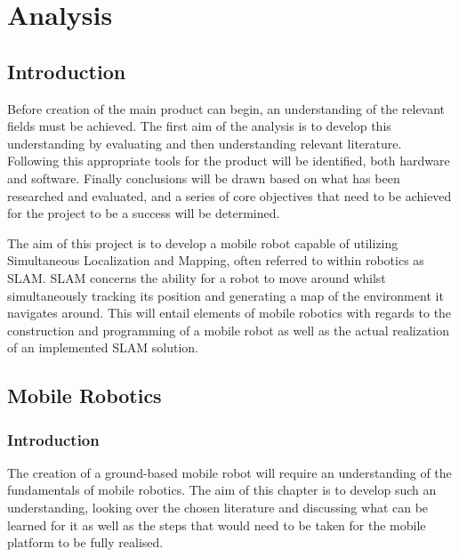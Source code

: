 \part{Analysis}
		\chapter{Introduction}
		Before creation of the main product can begin, an understanding of the relevant fields must be achieved. The first aim of the analysis is to develop this understanding by evaluating and then understanding relevant literature. Following this appropriate tools for the product will be identified, both hardware and software. Finally conclusions will be drawn based on what has been researched and evaluated, and a series of core objectives that need to be achieved for the project to be a success will be determined.

		The aim of this project is to develop a mobile robot capable of utilizing Simultaneous Localization and Mapping, often referred to within robotics as SLAM. SLAM concerns the ability for a robot to move around whilst simultaneously tracking its position and generating a map of the environment it navigates around. This will entail elements of mobile robotics with regards to the construction and programming of a mobile robot as well as the actual realization of an implemented SLAM solution.
		
		
		
		
		\chapter{Mobile Robotics}
			\section{Introduction}
			The creation of a ground-based mobile robot will require an understanding of the fundamentals of mobile robotics. The aim of this chapter is to develop such an understanding, looking over the chosen literature and discussing what can be learned for it as well as the steps that would need to be taken for the mobile platform to be fully realised.
			
